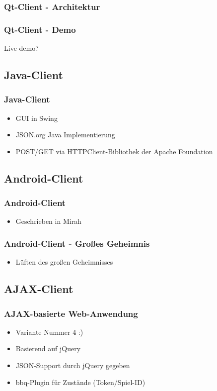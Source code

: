 \documentclass{beamer}
\begin{document}
\begin{frame}[fragile]
\frametitle{Qt-Client - Architektur}

\end{frame}

\begin{frame}[fragile]
\frametitle{Qt-Client - Demo}
Live demo?
\end{frame}

\subsection{Java-Client}
\begin{frame}[fragile]
\frametitle{Java-Client}
\begin{itemize}
\item GUI in Swing
\item JSON.org Java Implementierung
\item POST/GET via HTTPClient-Bibliothek der Apache Foundation
\end{itemize}
\end{frame}

\subsection{Android-Client}

\begin{frame}[fragile]
\frametitle{Android-Client}
\begin{itemize}
\item Geschrieben in Mirah
\end{itemize}
\end{frame}

\begin{frame}[fragile]
\frametitle{Android-Client - Großes Geheimnis}
\begin{itemize}
\item Lüften des großen Geheimnisses
\end{itemize}
\end{frame}

\subsection{AJAX-Client}

\begin{frame}[fragile]
\frametitle{AJAX-basierte Web-Anwendung}
\begin{itemize}
\item Variante Nummer 4 :)
\item Basierend auf jQuery
\item JSON-Support durch jQuery gegeben
\item bbq-Plugin für Zustände (Token/Spiel-ID)
\end{itemize}
\end{frame}
\end{document}

